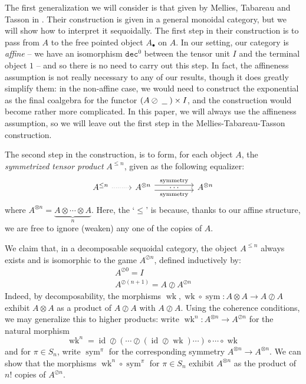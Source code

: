 \documentclass[a4paper,UKenglish]{lipics-v2016}
\theoremstyle{plain}
\theoremstyle{definition}
\newcommand*\from{\colon}
\DeclareMathOperator{\id}{id}
\newcommand{\tensor}{\otimes}
\newcommand{\sequoid}{\oslash}
\newcommand{\comp}[2]{#1 \circ #2}
\DeclareMathOperator{\sym}{sym}
\newcommand{\blank}{\;\underline{\hspace{1.5ex}}\;}
\DeclareMathOperator{\wk}{wk}
\newcommand{\dec}{{\mathtt{dec}}}
\newlength{\arrow}
\begin{document}
The first generalization we will consider is that given by Mellies, Tabareau and Tasson in \cite{MelliesCofCommCom}.  Their construction is given in a general monoidal category, but we will show how to interpret it sequoidally.  The first step in their construction is to pass from $A$ to the free pointed object $A_\bullet$ on $A$.  In our setting, our category is \emph{affine} -- we have an isomorphism $\dec^0$ between the tensor unit $I$ and the terminal object $1$ -- and so there is no need to carry out this step.  In fact, the affineness assumption is not really necessary to any of our results, though it does greatly simplify them: in the non-affine case, we would need to construct the exponential as the final coalgebra for the functor $(A\sequoid\blank)\times I$, and the construction would become rather more complicated.  In this paper, we will always use the affineness assumption, so we will leave out the first step in the Mellies-Tabareau-Tasson construction.

The second step in the construction, is to form, for each object $A$, the \emph{symmetrized tensor product} $A^{\le n}$, given as the following equalizer:
\[
  \begin{tikzcd}
    A^{\le n} \arrow[r, dotted]
      & A^{\tensor n} \arrow[r, yshift=0.3em, "\textrm{symmetry}"] \arrow[phantom, r, "\cdots"] \arrow[r, yshift=-0.3em, "\textrm{symmetry}"']
        &[24pt] A^{\tensor n}
  \end{tikzcd}
  \]
where $A^{\tensor n} = \underbrace{A\tensor\cdots\tensor A}_n$.  Here, the `$\le$' is because, thanks to our affine structure, we are free to ignore (weaken) any one of the copies of $A$.

We claim that, in a decomposable sequoidal category, the object $A^{\le n}$ always exists and is isomorphic to the game $A^{\sequoid n}$, defined inductively by:
\begin{gather*}
  A^{\sequoid 0} = I \\
  A^{\sequoid (n+1)} = A \sequoid A^{\sequoid n}
\end{gather*}
Indeed, by decomposability, the morphisms $\wk,\comp{\wk}{\sym}\from A\tensor A\to A\sequoid A$ exhibit $A\tensor A$ as a product of $A\sequoid A$ with $A\sequoid A$.  Using the coherence conditions, we may generalize this to higher products: write $\wk^n\from A^{\tensor n}\to A^{\sequoid n}$ for the natural morphism
\[
  \wk^n = \comp{\id\sequoid(\cdots\sequoid(\id\sequoid\wk)\cdots)}{\comp{\cdots}{\wk}}
  \]
and for $\pi\in S_n$, write $\sym^\pi$ for the corresponding symmetry $A^{\tensor n}\to A^{\tensor n}$.  We can show that the morphisms $\comp{\wk^n}{\sym^\pi}$ for $\pi\in S_n$ exhibit $A^{\tensor n}$ as the product of $n!$ copies of $A^{\sequoid n}$.  
\end{document}
